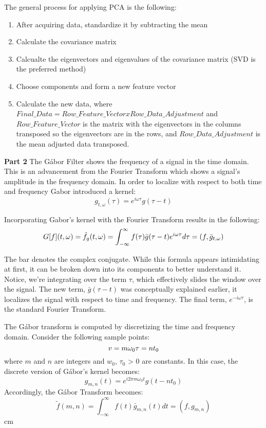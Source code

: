 \documentclass{cup-pan}
\begin{document}
\noindent
The general process for applying PCA is the following:
\begin{enumerate}[noitemsep]
	\item After acquiring data, standardize it by subtracting the mean\\
	\item Calculate the covariance matrix\\
	\item Calcualte the eigenvectors and eigenvalues of the covariance matrix (SVD is the preferred method)\\
	\item Choose components and form a new feature vector\\
	\item Calculate the new data, where $Final\_Data = Row\_Feature\_Vector x Row\_Data\_Adjustment$ and $Row\_Feature\_Vector$ is the matrix with the eigenvectors in the columns transposed so the eigenvectors are in the rows, and $Row\_Data\_Adjustment$ is the mean adjusted data transposed.\\ 
\end{enumerate}
	
\vskip 0.5cm
\noindent
\textbf{Part 2}
\noindent
The Gábor Filter shows the frequency of a signal in the time domain.  This is an advancement from the Fourier Transform which shows a signal's amplitude in the frequency domain. In order to localize with respect to both time and frequency Gabor introduced a kernel:
$$g_{t, \omega}(\tau) = e^{i \omega \tau}g(\tau - t)$$

\vskip 0.1in
\noindent
Incorporating Gabor's kernel with the Fourier Transform results in the following:
$$G[f](t,\omega) = \tilde{f}_g(t,\omega) = \int_{-\infty}^{\infty} \space f(\tau) \bar{g}(\tau - t) \space e^{i \omega \tau} d \tau \space = \space (f, \bar g_{t,\omega})$$

\vskip 0.1in
\noindent
The bar denotes the complex conjugate.  While this formula appears intimidating at first, it can be broken down into its components to better understand it.  Notice, we're integrating over the term $\tau$, which effectively slides the window over the signal.  The new term, $\bar g (\tau - t)$ was conceptually explained earlier, it localizes the signal with respect to time and frequency.  The final term, $e^{-i \omega \tau}$, is the standard Fourier Transform.

\vskip 0.1in
\noindent
The Gábor transform is computed by discretizing the time and frequency domain.  Consider the following sample points:
$$ v = m \omega_0 \\
\tau = n t_0$$
where $m$ and $n$ are integers and $w_0$, $\tau_0$ > 0 are constants. In this case, the discrete version of Gábor's kernel becomes:
$$g_{m,n}(t) = e^{i 2 \pi m \omega_0 t} g(t-n t_0)$$
Accordingly, the Gábor Transform becomes:
$$\tilde{f}(m,n) = \int^{\infty}_{-\infty} f(t) \bar g_{m,n}(t) dt = (f,g_{m,n})$$
 cm
\end{document}

